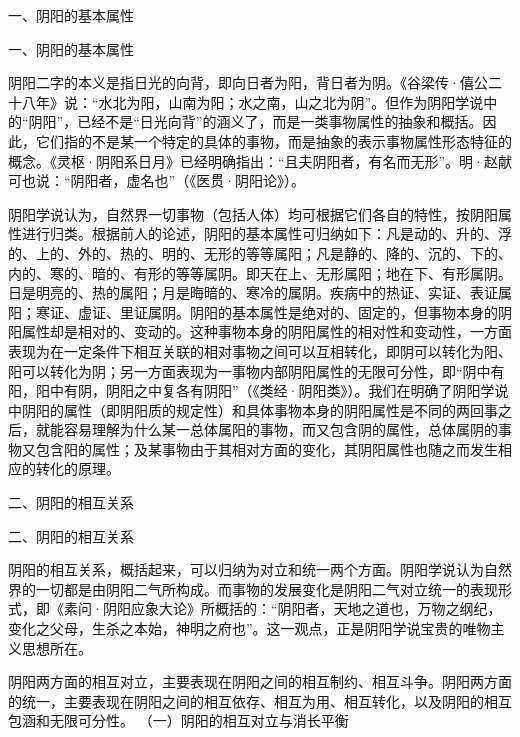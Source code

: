 \documentclass[a4paper,12pt,UTF8,twoside]{ctexbook}
\begin{document}
一、阴阳的基本属性

一、阴阳的基本属性

阴阳二字的本义是指日光的向背，即向日者为阳，背日者为阴。《谷梁传·僖公二十八年》说：“水北为阳，山南为阳；水之南，山之北为阴”。但作为阴阳学说中的“阴阳”，已经不是“日光向背”的涵义了，而是一类事物属性的抽象和概括。因此，它们指的不是某一个特定的具体的事物，而是抽象的表示事物属性形态特征的概念。《灵枢·阴阳系日月》已经明确指出：“且夫阴阳者，有名而无形”。明·赵献可也说：“阴阳者，虚名也”（《医贯·阴阳论》）。

阴阳学说认为，自然界一切事物（包括人体）均可根据它们各自的特性，按阴阳属性进行归类。根据前人的论述，阴阳的基本属性可归纳如下：凡是动的、升的、浮的、上的、外的、热的、明的、无形的等等属阳；凡是静的、降的、沉的、下的、内的、寒的、暗的、有形的等等属阴。即天在上、无形属阳；地在下、有形属阴。日是明亮的、热的属阳；月是晦暗的、寒冷的属阴。疾病中的热证、实证、表证属阳；寒证、虚证、里证属阴。阴阳的基本属性是绝对的、固定的，但事物本身的阴阳属性却是相对的、变动的。这种事物本身的阴阳属性的相对性和变动性，一方面表现为在一定条件下相互关联的相对事物之间可以互相转化，即阴可以转化为阳、阳可以转化为阴；另一方面表现为一事物内部阴阳属性的无限可分性，即“阴中有阳，阳中有阴，阴阳之中复各有阴阳”（《类经·阴阳类》）。我们在明确了阴阳学说中阴阳的属性（即阴阳质的规定性）和具体事物本身的阴阳属性是不同的两回事之后，就能容易理解为什么某一总体属阳的事物，而又包含阴的属性，总体属阴的事物又包含阳的属性；及某事物由于其相对方面的变化，其阴阳属性也随之而发生相应的转化的原理。

二、阴阳的相互关系

二、阴阳的相互关系

阴阳的相互关系，概括起来，可以归纳为对立和统一两个方面。阴阳学说认为自然界的一切都是由阴阳二气所构成。而事物的发展变化是阴阳二气对立统一的表现形式，即《素问·阴阳应象大论》所概括的：“阴阳者，天地之道也，万物之纲纪，变化之父母，生杀之本始，神明之府也”。这一观点，正是阴阳学说宝贵的唯物主义思想所在。

阴阳两方面的相互对立，主要表现在阴阳之间的相互制约、相互斗争。阴阳两方面的统一，主要表现在阴阳之间的相互依存、相互为用、相互转化，以及阴阳的相互包涵和无限可分性。
（一）阴阳的相互对立与消长平衡
\end{document}
